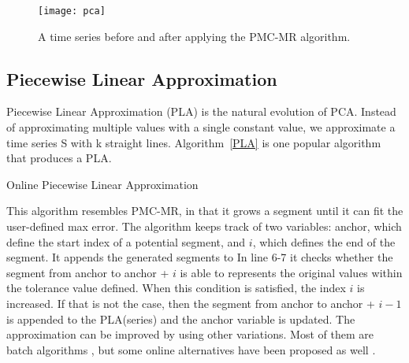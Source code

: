 \begin{figure}[!htbp]
\begin{center}
\texttt{[image: pca]}
\caption[pca]{A time series before and after applying the PMC-MR algorithm.}
\label{pca}
\end{center}
\end{figure}

\subsection{Piecewise Linear Approximation}
Piecewise Linear Approximation (PLA) is the natural evolution of PCA. Instead of
approximating multiple values with a single constant value, we approximate a time series
S with k straight lines. Algorithm~\ref{PLA} is one popular algorithm that produces a PLA.

\begin{algorithm}
\caption{Online Piecewise Linear Approximation \cite{Lazaridis2003Capturing}}\label{PLA}
\begin{algorithmic}[1]
    \EndWhile
\EndWhile
{}
\EndProcedure
\end{algorithmic}
\end{algorithm}

This algorithm resembles PMC-MR, in that it grows a segment until it can fit the user-defined
max error. The algorithm keeps track of two variables: anchor, which define the start index
of a potential segment, and $i$, which defines the end of the segment. It appends the generated
segments to  In line 6-7 it checks
whether the segment from anchor to anchor + $i$ is able to represents the original values
within the tolerance value defined.
When this condition is satisfied, the index $i$ is increased. If that is not the case,
then the segment from anchor to anchor + $i - 1$ is appended to the PLA(series)
and the anchor variable is updated. The approximation can be improved by using other variations.
Most of them are batch algorithms \cite{Douglas1973Algorithms}\cite{Park1999Fast}
\cite{Keogh1998An}, but some online alternatives have been
proposed as well \cite{Keogh2001An}.
